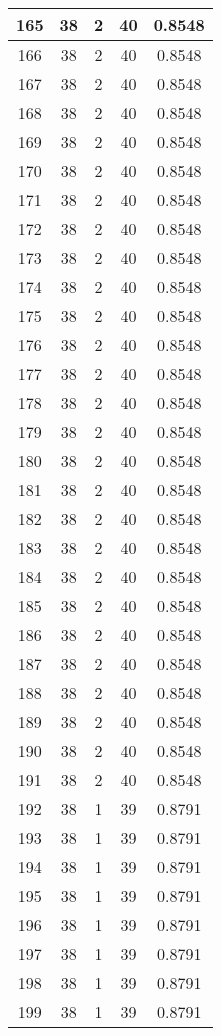 \documentclass[letterpaper, 12pt]{article}
\begin{document}
\begin{longtable}{|c|c|c|c|c|}
\hline
165 & 38 & 2 & 40 & 0.8548 \\
\hline
166 & 38 & 2 & 40 & 0.8548 \\
\hline
167 & 38 & 2 & 40 & 0.8548 \\
\hline
168 & 38 & 2 & 40 & 0.8548 \\
\hline
169 & 38 & 2 & 40 & 0.8548 \\
\hline
170 & 38 & 2 & 40 & 0.8548 \\
\hline
171 & 38 & 2 & 40 & 0.8548 \\
\hline
172 & 38 & 2 & 40 & 0.8548 \\
\hline
173 & 38 & 2 & 40 & 0.8548 \\
\hline
174 & 38 & 2 & 40 & 0.8548 \\
\hline
175 & 38 & 2 & 40 & 0.8548 \\
\hline
176 & 38 & 2 & 40 & 0.8548 \\
\hline
177 & 38 & 2 & 40 & 0.8548 \\
\hline
178 & 38 & 2 & 40 & 0.8548 \\
\hline
179 & 38 & 2 & 40 & 0.8548 \\
\hline
180 & 38 & 2 & 40 & 0.8548 \\
\hline
181 & 38 & 2 & 40 & 0.8548 \\
\hline
182 & 38 & 2 & 40 & 0.8548 \\
\hline
183 & 38 & 2 & 40 & 0.8548 \\
\hline
184 & 38 & 2 & 40 & 0.8548 \\
\hline
185 & 38 & 2 & 40 & 0.8548 \\
\hline
186 & 38 & 2 & 40 & 0.8548 \\
\hline
187 & 38 & 2 & 40 & 0.8548 \\
\hline
188 & 38 & 2 & 40 & 0.8548 \\
\hline
189 & 38 & 2 & 40 & 0.8548 \\
\hline
190 & 38 & 2 & 40 & 0.8548 \\
\hline
191 & 38 & 2 & 40 & 0.8548 \\
\hline
192 & 38 & 1 & 39 & 0.8791 \\
\hline
193 & 38 & 1 & 39 & 0.8791 \\
\hline
194 & 38 & 1 & 39 & 0.8791 \\
\hline
195 & 38 & 1 & 39 & 0.8791 \\
\hline
196 & 38 & 1 & 39 & 0.8791 \\
\hline
197 & 38 & 1 & 39 & 0.8791 \\
\hline
198 & 38 & 1 & 39 & 0.8791 \\
\hline
199 & 38 & 1 & 39 & 0.8791 \\
\hline
\end{longtable}
\end{document}
